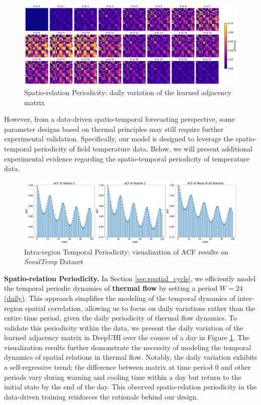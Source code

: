 \begin{figure}[!t]
    \centering
    \includegraphics[width=0.95\linewidth]{resources/flow_cycle.pdf}
    \vspace{-1em}
    \caption{Spatio-relation Periodicity: daily variation of the learned adjacency matrix}
    \label{fig:flow_cycle}
\end{figure}

However, from a data-driven spatio-temporal forecasting perspective, some parameter designs based on thermal principles may still require further experimental validation. Specifically, our model is designed to leverage the spatio-temporal periodicity of field temperature data. Below, we will present additional experimental evidence regarding the spatio-temporal periodicity of temperature data.


\begin{figure}[!h]
    \centering
    \includegraphics[width=0.95\linewidth]{resources/ACF.pdf}
    \caption{Intra-region Temporal Periodicity: visualization of ACF results on \textit{SeoulTemp} Dataset}
    \label{fig:acf}
\end{figure}

\textbf{Spatio-relation Periodicity.} In Section \ref{sec:spatial_cycle}, we efficiently model the temporal periodic dynamics of \textbf{thermal flow} by setting a period \underline{$W=24$ (daily)}. This approach simplifies the modeling of the temporal dynamics of inter-region spatial correlation, allowing us to focus on daily variations rather than the entire time period, given the daily periodicity of thermal flow dynamics. To validate this periodicity within the data, we present the daily variation of the learned adjacency matrix in DeepUHI over the course of a day in Figure \ref{fig:flow_cycle}. The visualization results further demonstrate the necessity of modeling the temporal dynamics of spatial relations in thermal flow. Notably, the daily variation exhibits a self-regressive trend; the difference between matrix at time period 0 and other periods vary during warning and cooling time within a day but return to the initial state by the end of the day. This observed spatio-relation periodicity in the data-driven training reinforces the rationale behind our design.




